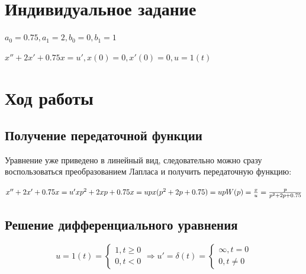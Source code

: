 \documentclass[14pt,a4paper,report]{report}
\begin{document}
\section{Индивидуальное задание}
$a_0=0.75,a_1=2,b_0=0,b_1=1$

$x''+2x'+0.75x=u', x(0)=0, x'(0)=0, u=1(t)$

\section{Ход работы}

\subsection{Получение передаточной функции}

Уравнение уже приведено в линейный вид, следовательно можно сразу воспользоваться преобразованием Лапласа и получить передаточную функцию:

$
\\
x''+2x'+0.75x=u'\\
xp^2+2xp+0.75x=up \\
x(p^2+2p+0.75)=up \\
W(p)=\frac{x}{u}=\frac{p}{p^2+2p+0.75}\\
$

%

\clearpage

\subsection{Решение дифференциального уравнения}

\begin{equation*}
	\text{$u=1(t)=$}
	\begin{cases}
		\text{$1, t\geq0$} \\
		\text{$0, t<0$}
	\end{cases}
	\Longrightarrow
	\text{$u'=\delta(t)=$}
	\begin{cases}
		\text{$\infty, t=0$} \\
		\text{$0, t\neq0$}
	\end{cases}
\end{equation*}
\end{document}
